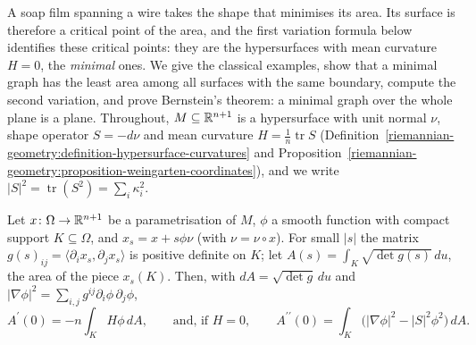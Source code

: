 A soap film spanning a wire takes the shape that minimises its area. Its surface is therefore a critical point of the area, and the first variation formula below
identifies these critical points: they are the hypersurfaces with mean curvature $H = 0$, the \emph{minimal} ones. We give the classical examples, show that a minimal
graph has the least area among all surfaces with the same boundary, compute the second variation, and prove Bernstein's theorem: a minimal graph over the whole plane is
a plane. Throughout, $M \subseteq \mathbb{R}^{n+1}$ is a hypersurface with unit normal $\nu$, shape operator $S = -d\nu$ and mean curvature $H = \frac1n\operatorname{tr}S$
(Definition~\ref{riemannian-geometry:definition-hypersurface-curvatures} and Proposition~\ref{riemannian-geometry:proposition-weingarten-coordinates}), and we write
$|S|^2 = \operatorname{tr}(S^2) = \sum_i\kappa_i^2$.

\begin{proposition}\label{riemannian-geometry:proposition-variation-area}
Let $x \colon \Omega \to \mathbb{R}^{n+1}$ be a parametrisation of $M$, $\phi$ a smooth function with compact support $K \subseteq \Omega$, and $x_s = x + s\phi\nu$ (with
$\nu = \nu \circ x$). For small $|s|$ the matrix $g(s)_{ij} = \langle\partial_ix_s, \partial_jx_s\rangle$ is positive definite on $K$; let
$A(s) = \int_K\sqrt{\det g(s)}\,du$, the area of the piece $x_s(K)$. Then, with $dA = \sqrt{\det g}\,du$ and $|\nabla\phi|^2 = \sum_{i,j}g^{ij}\partial_i\phi\,\partial_j\phi$,
\[
A^{\prime}(0) = -n\int_KH\phi\,dA, \qquad\text{and, if } H = 0, \qquad A^{\prime\prime}(0) = \int_K\bigl(|\nabla\phi|^2 - |S|^2\phi^2\bigr)\,dA .
\]
\end{proposition}

